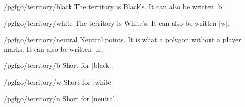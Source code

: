 	\begin{key}{/pgfgo/territory/black}
		The territory is Black's. It can also be written |b|.
	\end{key}

	\begin{key}{/pgfgo/territory/white}
		The territory is White's. It can also be written |w|.
	\end{key}

	\begin{key}{/pgfgo/territory/neutral}
		Neutral points. It is what a polygon without a player marks. It can also be written |n|.
	\end{key}

	\begin{key}{/pgfgo/territory/b}
		Short for |black|.
	\end{key}

	\begin{key}{/pgfgo/territory/w}
		Short for |white|.
	\end{key}

	\begin{key}{/pgfgo/territory/n}
		Short for |neutral|.
	\end{key}

